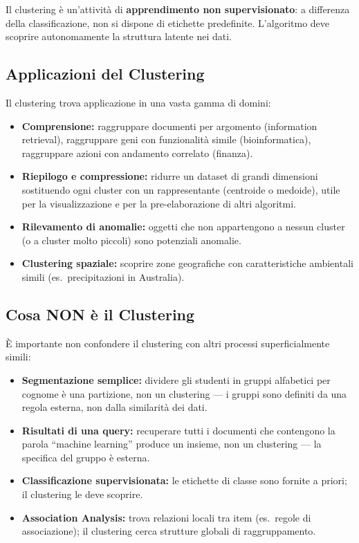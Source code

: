 Il clustering è un'attività di \textbf{apprendimento non supervisionato}: a differenza della classificazione, non si dispone di etichette predefinite. L'algoritmo deve scoprire autonomamente la struttura latente nei dati.

\subsection{Applicazioni del Clustering}

Il clustering trova applicazione in una vasta gamma di domini:

\begin{itemize}
  \item \textbf{Comprensione:} raggruppare documenti per argomento (information retrieval), raggruppare geni con funzionalità simile (bioinformatica), raggruppare azioni con andamento correlato (finanza).
  \item \textbf{Riepilogo e compressione:} ridurre un dataset di grandi dimensioni sostituendo ogni cluster con un rappresentante (centroide o medoide), utile per la visualizzazione e per la pre-elaborazione di altri algoritmi.
  \item \textbf{Rilevamento di anomalie:} oggetti che non appartengono a nessun cluster (o a cluster molto piccoli) sono potenziali anomalie.
  \item \textbf{Clustering spaziale:} scoprire zone geografiche con caratteristiche ambientali simili (es.\ precipitazioni in Australia).
\end{itemize}

\subsection{Cosa NON è il Clustering}

È importante non confondere il clustering con altri processi superficialmente simili:

\begin{itemize}
  \item \textbf{Segmentazione semplice:} dividere gli studenti in gruppi alfabetici per cognome è una partizione, non un clustering — i gruppi sono definiti da una regola esterna, non dalla similarità dei dati.
  \item \textbf{Risultati di una query:} recuperare tutti i documenti che contengono la parola ``machine learning'' produce un insieme, non un clustering — la specifica del gruppo è esterna.
  \item \textbf{Classificazione supervisionata:} le etichette di classe sono fornite a priori; il clustering le deve scoprire.
  \item \textbf{Association Analysis:} trova relazioni locali tra item (es.\ regole di associazione); il clustering cerca strutture globali di raggruppamento.
\end{itemize}

